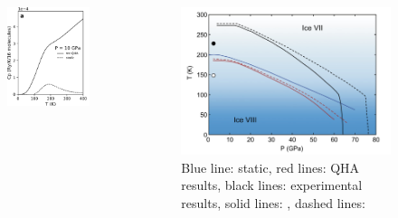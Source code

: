 \documentclass[13pt,aspectratio=169]{beamer}
\newcommand*{\RMN}[1]{\uppercase\expandafter{\romannumeral#1}}
\begin{document}
\begin{frame}{\subsecname{} \RMN{3}}
	\begin{columns}
		\begin{column}{0.4\textwidth}
			\begin{figure}[t]
				\includegraphics[width=\columnwidth]{images/cp}%
			\end{figure}
		\end{column}

		\begin{column}{0.55\textwidth}
			\begin{figure}[t]
				\includegraphics[width=\columnwidth]{images/boundary}%
				\caption{Blue line: static, red lines: QHA results, black lines: experimental results,
				solid lines: , dashed lines: }
			\end{figure}
		\end{column}
	\end{columns}
\end{frame}
\end{document}
